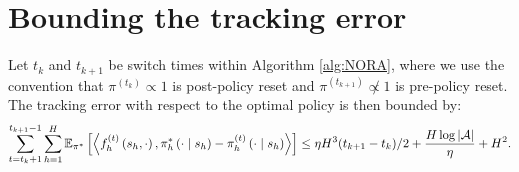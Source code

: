 \section{Bounding the tracking error}
\begin{lem}
    Let $t_k$ and $t_{k+1}$ be switch times within Algorithm \ref{alg:NORA}, where we use the convention that $\pi^{(t_k)} \propto 1$ is post-policy reset and $\pi^{(t_{k+1})} \not\propto 1$ is pre-policy reset. The tracking error with respect to the optimal policy is then bounded by:
    $$\sum_{t=t_k+1}^{t_{k+1}-1} \sum_{h=1}^H \mathbb{E}_{\pi^*}\left[\left\langle f_h^{(t)}\left(s_h, \cdot\right), \pi_h^*\left(\cdot \mid s_h\right)-\pi_h^{(t)}\left(\cdot \mid s_h\right)\right\rangle\right] \leq \eta H^3 (t_{k+1} - t_k)/2 + \frac{H \log |{\mathcal{A}}|}{\eta} + H^2.$$
    \label{lem:mirror-descent-nora}
\end{lem}
